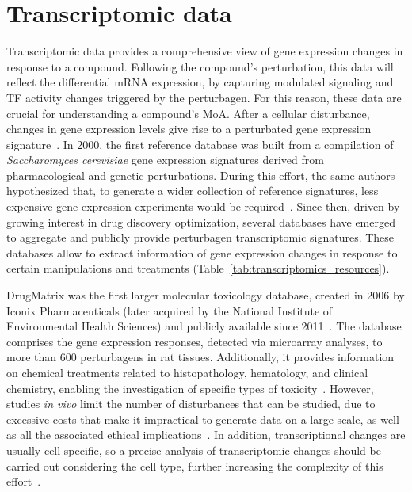 \section{Transcriptomic data}
\label{sec:Transcriptomic_data}

Transcriptomic data provides a comprehensive view of gene expression changes in response to a compound. 
Following the compound's perturbation, this data will reflect the differential mRNA expression, by capturing modulated signaling and \gls{TF} activity changes triggered by the perturbagen. 
For this reason, these data are crucial for understanding a compound's \gls{MoA}. 
After a cellular disturbance, changes in gene expression levels give rise to a perturbated gene expression signature~\cite{RN114}. 
In 2000, the first reference database was built from a compilation of \textit{Saccharomyces cerevisiae} gene expression signatures derived from pharmacological and genetic perturbations. 
During this effort, the same authors hypothesized that, to generate a wider collection of reference signatures, less expensive gene expression experiments would be required~\cite{RN115, RN116, RN117}. 
Since then, driven by growing interest in drug discovery optimization, several databases have emerged to aggregate and publicly provide perturbagen transcriptomic signatures. 
These databases allow to extract information of gene expression changes in response to certain manipulations and treatments (Table~\ref{tab:transcriptomics_resources}).


DrugMatrix was the first larger molecular toxicology database, created in 2006 by Iconix Pharmaceuticals (later acquired by the National Institute of Environmental Health Sciences) and publicly available since 2011~\cite{RN115, RN118, RN119}. 
The database comprises the gene expression responses, detected via microarray analyses, to more than 600 perturbagens in rat tissues. 
Additionally, it provides information on chemical treatments related to histopathology, hematology, and clinical chemistry, enabling the investigation of specific types of toxicity~\cite{RN121}. 
However, studies \textit{in vivo} limit the number of disturbances that can be studied, due to excessive costs that make it impractical to generate data on a large scale, as well as all the associated ethical implications~\cite{RN34}. 
In addition, transcriptional changes are usually cell-specific, so a precise analysis of transcriptomic changes should be carried out considering the cell type, further increasing the complexity of this effort~\cite{RN86}.



